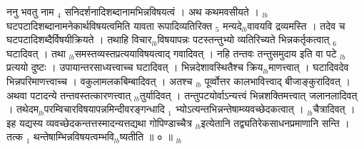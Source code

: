 \documentclass[article,12pt,a4paper]{memoir}%
\newcounter{parCount}
\begin{document}
	  
	  \pstart \leavevmode%
	ननु भवतु नाम {\tiny $_{4}$} सनिदर्शनादिशब्दानामभिन्नविषयत्वं । अथ कथमवसीयते । {\tiny $_{lb}$}घटपटादिशब्दानामनेकार्थविषयत्वमिति यावता रूपादिव्यतिरिक्त {\tiny $_{5}$} मन्यदे{\tiny $_{lb}$}वावयवि द्रव्यमस्ति । तदेव च घटपटादिशब्दैर्विषयीक्रियते । तथाहि विचार{\tiny $_{lb}$}विषयापन्नः पटस्तन्तुभ्यो व्यतिरिच्यते भिन्नकर्तृकत्वात् {\tiny $_{6}$} घटादिवत् । तथा {\tiny $_{lb}$}समस्तव्यस्तप्रत्ययाविषयत्वाद् गवादिवत् । नहि तन्तवः तन्तुसमुदाय इति वा पटे {\tiny $_{lb}$}प्रत्ययो दुष्टः । उपायान्तरसाध्यत्त्वाच्च घटादिवत् । भिन्नदेशावस्थितैश्च क्रिय{\tiny $_{lb}$}माणत्त्वात् । घटादिवदेव भिन्नपरिमाणत्त्वाच्च । वकुलामलकबिम्बादिवत् । अतश्च {\tiny $_{lb}$} \leavevmode{} पूर्व्वोत्तर कालभावित्त्वाद् बीजाङ्कुरादिवत् । अथवा पटादन्ये तन्तवस्तत्कारणत्त्वात् {\tiny $_{lb}$}तुर्यादिवत् । तन्तुपटयोर्वाऽन्यत्त्वं भिन्नशक्तिमत्त्वात् जलानलादिवत् । तथेदम{\tiny $_{lb}$}परम्विचारविषयापन्नमिन्दीवरङ्गन्धादि {\tiny $_{1}$} भ्योऽत्यन्तभिन्नन्तेषाम्व्यवच्छेदकत्वात् । {\tiny $_{lb}$}चैत्रादिवत् । इह यद्यस्य व्यवच्छेदकन्तत्तस्मादन्यत्तद्यथा गोपिण्डाच्चैत्र {\tiny $_{lb}$}इत्येतानि तद्व्यतिरेकसाधनप्रमाणानि सन्ति । तत्क {\tiny $_{1}$} थन्तेषाम्भिन्नविषयत्वम्भवि{\tiny $_{lb}$}ष्यतीति ॥ ० ॥
	{}
	\pend%
      {\tiny $_{lb}$}
\end{document}
